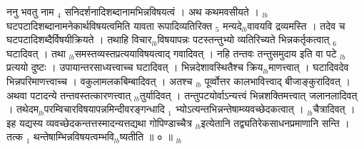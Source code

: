 \documentclass[article,12pt,a4paper]{memoir}%
\newcounter{parCount}
\begin{document}
	  
	  \pstart \leavevmode%
	ननु भवतु नाम {\tiny $_{4}$} सनिदर्शनादिशब्दानामभिन्नविषयत्वं । अथ कथमवसीयते । {\tiny $_{lb}$}घटपटादिशब्दानामनेकार्थविषयत्वमिति यावता रूपादिव्यतिरिक्त {\tiny $_{5}$} मन्यदे{\tiny $_{lb}$}वावयवि द्रव्यमस्ति । तदेव च घटपटादिशब्दैर्विषयीक्रियते । तथाहि विचार{\tiny $_{lb}$}विषयापन्नः पटस्तन्तुभ्यो व्यतिरिच्यते भिन्नकर्तृकत्वात् {\tiny $_{6}$} घटादिवत् । तथा {\tiny $_{lb}$}समस्तव्यस्तप्रत्ययाविषयत्वाद् गवादिवत् । नहि तन्तवः तन्तुसमुदाय इति वा पटे {\tiny $_{lb}$}प्रत्ययो दुष्टः । उपायान्तरसाध्यत्त्वाच्च घटादिवत् । भिन्नदेशावस्थितैश्च क्रिय{\tiny $_{lb}$}माणत्त्वात् । घटादिवदेव भिन्नपरिमाणत्त्वाच्च । वकुलामलकबिम्बादिवत् । अतश्च {\tiny $_{lb}$} \leavevmode{} पूर्व्वोत्तर कालभावित्त्वाद् बीजाङ्कुरादिवत् । अथवा पटादन्ये तन्तवस्तत्कारणत्त्वात् {\tiny $_{lb}$}तुर्यादिवत् । तन्तुपटयोर्वाऽन्यत्त्वं भिन्नशक्तिमत्त्वात् जलानलादिवत् । तथेदम{\tiny $_{lb}$}परम्विचारविषयापन्नमिन्दीवरङ्गन्धादि {\tiny $_{1}$} भ्योऽत्यन्तभिन्नन्तेषाम्व्यवच्छेदकत्वात् । {\tiny $_{lb}$}चैत्रादिवत् । इह यद्यस्य व्यवच्छेदकन्तत्तस्मादन्यत्तद्यथा गोपिण्डाच्चैत्र {\tiny $_{lb}$}इत्येतानि तद्व्यतिरेकसाधनप्रमाणानि सन्ति । तत्क {\tiny $_{1}$} थन्तेषाम्भिन्नविषयत्वम्भवि{\tiny $_{lb}$}ष्यतीति ॥ ० ॥
	{}
	\pend%
      {\tiny $_{lb}$}
\end{document}
